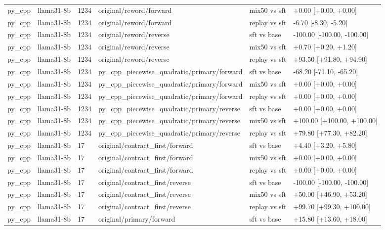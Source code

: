 \begin{table}[t]
\begin{tabular}{llllll}
py\_cpp & llama31-8b & 1234 & original/reword/forward & mix50 vs sft & +0.00 [+0.00, +0.00] \\
py\_cpp & llama31-8b & 1234 & original/reword/forward & replay vs sft & -6.70 [-8.30, -5.20] \\
py\_cpp & llama31-8b & 1234 & original/reword/reverse & sft vs base & -100.00 [-100.00, -100.00] \\
py\_cpp & llama31-8b & 1234 & original/reword/reverse & mix50 vs sft & +0.70 [+0.20, +1.20] \\
py\_cpp & llama31-8b & 1234 & original/reword/reverse & replay vs sft & +93.50 [+91.80, +94.90] \\
py\_cpp & llama31-8b & 1234 & py\_cpp\_piecewise\_quadratic/primary/forward & sft vs base & -68.20 [-71.10, -65.20] \\
py\_cpp & llama31-8b & 1234 & py\_cpp\_piecewise\_quadratic/primary/forward & mix50 vs sft & +0.00 [+0.00, +0.00] \\
py\_cpp & llama31-8b & 1234 & py\_cpp\_piecewise\_quadratic/primary/forward & replay vs sft & +0.00 [+0.00, +0.00] \\
py\_cpp & llama31-8b & 1234 & py\_cpp\_piecewise\_quadratic/primary/reverse & sft vs base & +0.00 [+0.00, +0.00] \\
py\_cpp & llama31-8b & 1234 & py\_cpp\_piecewise\_quadratic/primary/reverse & mix50 vs sft & +100.00 [+100.00, +100.00] \\
py\_cpp & llama31-8b & 1234 & py\_cpp\_piecewise\_quadratic/primary/reverse & replay vs sft & +79.80 [+77.30, +82.20] \\
py\_cpp & llama31-8b & 17 & original/contract\_first/forward & sft vs base & +4.40 [+3.20, +5.80] \\
py\_cpp & llama31-8b & 17 & original/contract\_first/forward & mix50 vs sft & +0.00 [+0.00, +0.00] \\
py\_cpp & llama31-8b & 17 & original/contract\_first/forward & replay vs sft & +0.00 [+0.00, +0.00] \\
py\_cpp & llama31-8b & 17 & original/contract\_first/reverse & sft vs base & -100.00 [-100.00, -100.00] \\
py\_cpp & llama31-8b & 17 & original/contract\_first/reverse & mix50 vs sft & +50.00 [+46.90, +53.20] \\
py\_cpp & llama31-8b & 17 & original/contract\_first/reverse & replay vs sft & +99.70 [+99.30, +100.00] \\
py\_cpp & llama31-8b & 17 & original/primary/forward & sft vs base & +15.80 [+13.60, +18.00] \\

\end{tabular}
\end{table}

